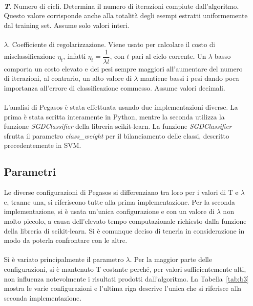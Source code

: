 \documentclass[12pt,a4paper,oneside,hidelinks]{report}
\begin{document}
\paragraph*{}
\textbf{\textit{T}}. Numero di cicli. Determina il numero di iterazioni compiute dall'algoritmo. Questo valore corrisponde anche alla totalità degli esempi estratti uniformemente dal training set. Assume solo valori interi.

\paragraph*{}
$\mathbf{\mathit{\lambda}}$. Coefficiente di regolarizzazione. Viene usato per calcolare il costo di misclassificazione $\eta_t$, infatti $\eta_t = \dfrac{1}{\lambda t}$, con $t$ pari al ciclo corrente. Un $\lambda$ basso comporta un costo elevato e dei pesi sempre maggiori all'aumentare del numero di iterazioni, al contrario, un alto valore di $\lambda$ mantiene bassi i pesi dando poca importanza all'errore di classificazione commesso. Assume valori decimali.

\paragraph*{}
L'analisi di Pegasos è stata effettuata usando due implementazioni diverse. La prima è stata scritta interamente in Python, mentre la seconda utilizza la funzione \textit{SGDClassifier} della libreria scikit-learn.
La funzione \textit{SGDClassifier} sfrutta il parametro \textit{class\_weight} per il bilanciamento delle classi, descritto precedentemente in SVM.  

\subsection{Parametri}
Le diverse configurazioni di Pegasos si differenziano tra loro per i valori di T e $\lambda$ e, tranne una, si riferiscono tutte alla prima implementazione. Per la seconda implementazione, si è usata un'unica configurazione e con un valore di $\lambda$ non molto piccolo, a causa dell'elevato tempo computazionale richiesto dalla funzione della libreria di scikit-learn. Si è comunque deciso di tenerla in considerazione in modo da poterla confrontare con le altre.

\paragraph*{}
Si è variato principalmente il parametro $\lambda$. Per la maggior parte delle configurazioni, si è mantenuto T costante perché, per valori sufficientemente alti, non influenza notevolmente i risultati prodotti dall'algoritmo. La Tabella~\ref{tab:b3} mostra le varie configurazioni e l'ultima riga descrive l'unica che si riferisce alla seconda implementazione.
\end{document}

